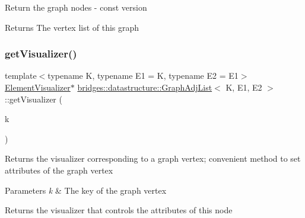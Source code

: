 Return the graph nodes -\/ const version

\begin{DoxyReturn}{Returns}
The vertex list of this graph 
\end{DoxyReturn}
\mbox{\label{classbridges_1_1datastructure_1_1_graph_adj_list_a097e4678b1273c29b1ac63319b4535e5}} 
\subsubsection{\texorpdfstring{getVisualizer()}{getVisualizer()}}
{\footnotesize\ttfamily template$<$typename K, typename E1 = K, typename E2 = E1$>$ \\
\mbox{\hyperlink{classbridges_1_1datastructure_1_1_element_visualizer}{Element\+Visualizer}}$\ast$ \mbox{\hyperlink{classbridges_1_1datastructure_1_1_graph_adj_list}{bridges\+::datastructure\+::\+Graph\+Adj\+List}}$<$ K, E1, E2 $>$\+::get\+Visualizer (\begin{DoxyParamCaption}\item[{const K \&}]{k }\end{DoxyParamCaption})\hspace{0.3cm}{\ttfamily [inline]}}

Returns the visualizer corresponding to a graph vertex; convenient method to set attributes of the graph vertex


\begin{DoxyParams}{Parameters}
{\em k} & The key of the graph vertex\\
\hline
\end{DoxyParams}
\begin{DoxyReturn}{Returns}
the visualizer that controls the attributes of this node 
\end{DoxyReturn}
\mbox{\label{classbridges_1_1datastructure_1_1_graph_adj_list_a0562e8d82499f26ad656a1dfb5f8908e}} 
